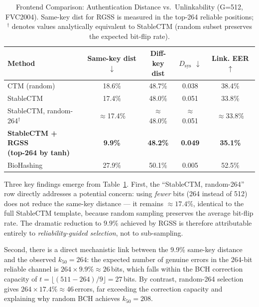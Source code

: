 \documentclass[journal]{IEEEtran}
\begin{document}
\begin{table}[!t]
  \renewcommand{\arraystretch}{1.2}
  \caption{Frontend Comparison: Authentication Distance vs.\
  Unlinkability (G=512, FVC2004).
  Same-key dist for RGSS is measured in the top-264 reliable
  positions; $^\dagger$ denotes values analytically
  equivalent to StableCTM (random subset preserves the
  expected bit-flip rate).}
  \label{tab:frontend_unlink}
  \centering
  \footnotesize
  \begin{tabular}{lcccc}
    \toprule
    Method &
    \makecell{Same-key\\dist $\downarrow$} &
    \makecell{Diff-key\\dist} &
    $D_\text{sys}$ $\downarrow$ &
    \makecell{Link.\\EER $\uparrow$} \\
    \midrule
    CTM (random)
      & 18.6\% & 48.7\% & 0.038 & 38.4\% \\
    StableCTM
      & 17.4\% & 48.0\% & 0.051 & 33.8\% \\
    \makecell[l]{StableCTM,\\random-264$^\dagger$}
      & ${\approx}$17.4\% & ${\approx}$48.0\% & ${\approx}$0.051 & ${\approx}$33.8\% \\
    \makecell[l]{\textbf{StableCTM + RGSS}\\\textbf{(top-264 by tanh)}}
      & \textbf{9.9\%} & \textbf{48.2\%} & \textbf{0.049} & \textbf{35.1\%} \\
    BioHashing
      & 27.9\% & 50.1\% & 0.005 & 52.5\% \\
    \bottomrule
  \end{tabular}
\end{table}

Three key findings emerge from Table~\ref{tab:frontend_unlink}.
First, the ``StableCTM, random-264'' row directly addresses a
potential concern: using \emph{fewer} bits (264 instead of 512)
does not reduce the same-key distance — it remains ${\approx}17.4\%$,
identical to the full StableCTM template, because random sampling
preserves the average bit-flip rate.
The dramatic reduction to $9.9\%$ achieved by RGSS is therefore
attributable entirely to \emph{reliability-guided selection}, not
to sub-sampling.

Second, there is a direct mechanistic link between the 9.9\%
same-key distance and the observed $k_{50}\!=\!264$:
the expected number of genuine errors in the 264-bit reliable channel
is $264 \times 9.9\% \approx 26$\,bits, which falls within the BCH
correction capacity of $t\!=\!\lfloor(511-264)/9\rfloor=27$\,bits.
By contrast, random-264 selection gives $264 \times 17.4\%
\approx 46$\,errors, far exceeding the correction capacity and
explaining why random BCH achieves $k_{50}\!=\!208$.
\end{document}
